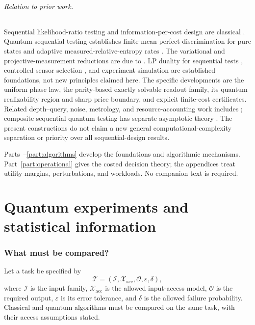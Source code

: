 \documentclass[11pt,a4paper]{article}
\theoremstyle{definition}
\theoremstyle{remark}
\numberwithin{equation}{section}
\begin{document}
\paragraph{Relation to prior work.}
Sequential likelihood-ratio testing and information-per-cost design are
classical \citep{wald1945,chernoff1959,nitinawarat2015}. Quantum sequential
testing establishes finite-mean perfect discrimination for pure states
\citep{vargas2021} and adaptive measured-relative-entropy rates
\citep{li2022}. The variational and projective-measurement reductions are
due to \citet{berta2017}. LP duality for sequential tests
\citep[Theorems 4.1--4.2]{fauss2015}, controlled sensor selection
\citep[Theorems 1--3]{lisensor2019}, and experiment simulation
\citep{blackwell1953} are established foundations, not new principles
claimed here. The specific developments are the uniform phase law, the
parity-based exactly solvable readout family, its quantum realizability
region and sharp price boundary, and explicit finite-cost certificates.
Related depth--query, noise, metrology, and resource-accounting work
includes \citet{giurgica2022,tanaka2021,demkowicz2012,dalzell2025}; composite
sequential quantum testing has separate asymptotic theory
\citep{simpson2026}. The present constructions do not claim a new general
computational-complexity separation or priority over all sequential-design
results.

Parts~\ref{part:foundations}--\ref{part:algorithms} develop the foundations
and algorithmic mechanisms. Part~\ref{part:operational} gives the costed
decision theory; the appendices treat utility margins, perturbations,
and workloads. No companion text is required.

\clearpage
\part{Quantum experiments and statistical information}\label{part:foundations}
\section{What must be compared?}\label{sec:comparison}
Let a task be specified by
\begin{equation}
 \mathcal T=(\mathcal I,\mathcal X_{\mathrm{acc}},\mathcal O,\varepsilon,\delta),
\end{equation}
where $\mathcal I$ is the input family, $\mathcal X_{\mathrm{acc}}$ is the allowed input-access
model, $\mathcal O$ is the required output, $\varepsilon$ is its error
tolerance, and $\delta$ is the allowed failure probability. Classical and
quantum algorithms must be compared on the same task, with their access
assumptions stated.
\end{document}
